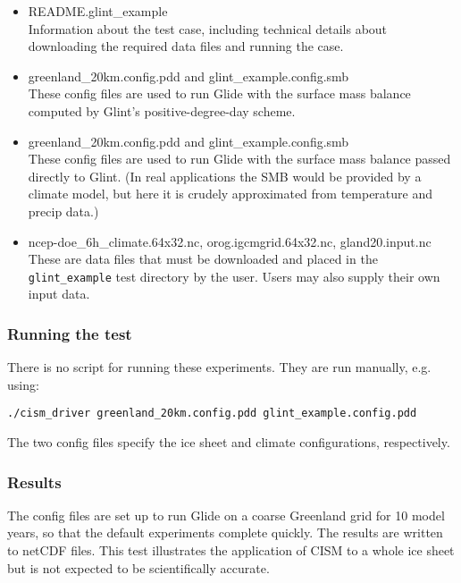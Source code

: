 \begin{itemize}
	\item README.glint\_example \\
         Information about the test case, including technical details about downloading the required data files
         and running the case.
  	\item greenland\_20km.config.pdd and glint\_example.config.smb \\
  	 These config files are used to run Glide with the surface mass balance computed by Glint's positive-degree-day scheme.
  	\item greenland\_20km.config.pdd and glint\_example.config.smb \\
  	 These config files are used to run Glide with the surface mass balance passed directly to Glint.
         (In real applications the SMB would be provided by a climate model, but here it is crudely approximated from
         temperature and precip data.)
  	\item  ncep-doe\_6h\_climate.64x32.nc, orog.igcmgrid.64x32.nc, gland20.input.nc \\
    	 These are data files that must be downloaded and placed in the \texttt{glint\_example} test directory by the user.
         Users may also supply their own input data.
\end{itemize}

\subsubsection{Running the test}
There is no script for running these experiments. They are run manually, e.g. using: 

\texttt{./cism\_driver greenland\_20km.config.pdd glint\_example.config.pdd}

The two config files specify the ice sheet and climate configurations, respectively. 

\subsubsection{Results}

The config files are set up to run Glide on a coarse Greenland grid for 10 model years,
so that the default experiments complete quickly.  The results are written to netCDF files.
This test illustrates the application of CISM to a whole ice sheet but is not expected
to be scientifically accurate.

